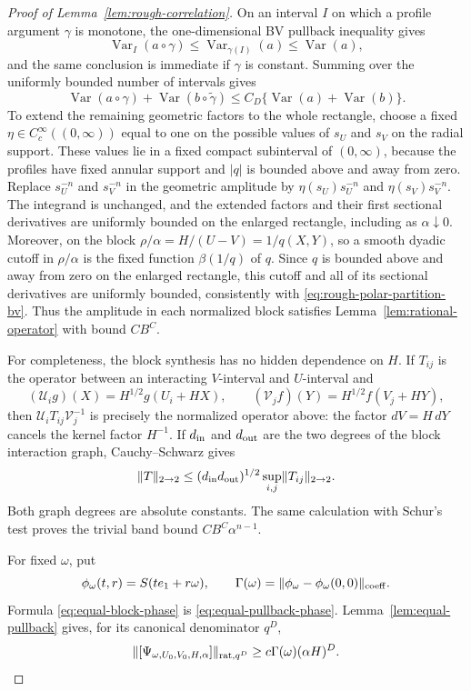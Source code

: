 \documentclass[11pt]{article}
\numberwithin{equation}{section}
\theoremstyle{remark}
\theoremstyle{definition}
\newcommand{\Var}{\operatorname{Var}}
\newcommand{\norm}[1]{\lVert #1\rVert}
\begin{document}
\begin{proof}[Proof of Lemma~\ref{lem:rough-correlation}]
On an interval $I$ on which a profile argument $\gamma$ is monotone, the
one-dimensional BV pullback inequality gives
\[
 \Var_I(a\circ\gamma)
 \le\Var_{\gamma(I)}(a)\le\Var(a),
\]
and the same conclusion is immediate if $\gamma$ is constant.  Summing
over the uniformly bounded number of intervals gives
\[
 \Var(a\circ\gamma)+\Var(b\circ\widetilde\gamma)
 \le C_D\{\Var(a)+\Var(b)\}.
\]
To extend the remaining geometric factors to the whole rectangle, choose
a fixed $\eta\in C_c^\infty((0,\infty))$ equal to one on the possible
values of $s_U$ and $s_V$ on the radial support. These values lie in a
fixed compact subinterval of $(0,\infty)$, because the profiles have
fixed annular support and $|q|$ is bounded above and away from zero.
Replace $s_U^{-n}$ and $s_V^{-n}$ in the geometric amplitude by
$\eta(s_U)s_U^{-n}$ and $\eta(s_V)s_V^{-n}$. The integrand is unchanged,
and the extended factors and their first sectional derivatives are
uniformly bounded on the enlarged rectangle, including as
$\alpha\downarrow0$. Moreover, on the block
$\rho/\alpha=H/(U-V)=1/q(X,Y)$, so a smooth dyadic cutoff in
$\rho/\alpha$ is the fixed function $\beta(1/q)$ of $q$.  Since $q$ is
bounded above and away from zero on the enlarged rectangle, this cutoff
and all of its sectional derivatives are uniformly bounded, consistently
with \eqref{eq:rough-polar-partition-bv}.
Thus the amplitude in each normalized block
satisfies Lemma~\ref{lem:rational-operator} with bound $CB^C$.

For completeness, the block synthesis has no hidden dependence on $H$.
If $T_{ij}$ is the operator between an interacting $V$-interval and
$U$-interval and
\[
 (\mathcal U_i g)(X)=H^{1/2}g(U_i+HX),\qquad
 (\mathcal V_j f)(Y)=H^{1/2}f(V_j+HY),
\]
then $\mathcal U_iT_{ij}\mathcal V_j^{-1}$ is precisely the normalized
operator above: the factor $dV=H\,dY$ cancels the kernel factor $H^{-1}$.
If $d_{\rm in}$ and $d_{\rm out}$ are the two degrees of the block
interaction graph, Cauchy--Schwarz gives
\[
 \norm T_{2\to2}
 \le(d_{\rm in}d_{\rm out})^{1/2}
     \sup_{i,j}\norm{T_{ij}}_{2\to2}.
\]
Both graph degrees are absolute constants.  The same calculation with
Schur's test proves the trivial band bound $CB^C\alpha^{n-1}$.

For fixed $\omega$, put
\[
 \phi_\omega(t,r)=S(te_1+r\omega),\qquad
 \Gamma(\omega)=\norm{\phi_\omega-\phi_\omega(0,0)}_{\rm coeff}.
\]
Formula \eqref{eq:equal-block-phase} is
\eqref{eq:equal-pullback-phase}.  Lemma~\ref{lem:equal-pullback} gives,
for its canonical denominator $q^D$,
\[
 \norm{[\Psi_{\omega,U_0,V_0,H,\alpha}]}_{{\rm rat},q^D}
 \ge c\Gamma(\omega)(\alpha H)^D.
\]


\end{proof}
\end{document}
